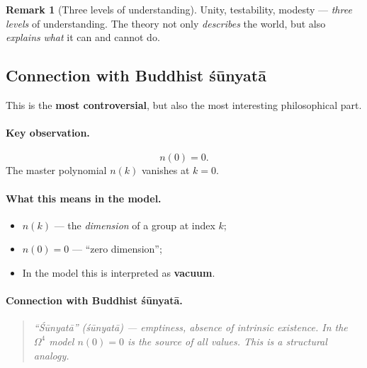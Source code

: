 \documentclass[11pt,a4paper]{article}
\newcommand{\Om}{\Omega^4}
\theoremstyle{definition}
\newtheorem{remark}[theorem]{Remark}
\begin{document}
\begin{remark}[Three levels of understanding]
\label{rem:three-understanding}
Unity, testability, modesty — \emph{three levels} of 
understanding. The theory not only \emph{describes} the world, but also 
\emph{explains} \emph{what} it can and cannot do.
\end{remark}

\subsection{Connection with Buddhist śūnyatā}
\label{subsec:shunyata}

This is the \textbf{most controversial}, but also the most interesting 
philosophical part.

\paragraph{Key observation.}
\begin{equation}
    \boxed{
    n(0) = 0.
    }
    \label{eq:n-zero}
\end{equation}
The master polynomial $n(k)$ vanishes at $k = 0$.

\paragraph{What this means in the model.}
\begin{itemize}
    \item $n(k)$ — the \emph{dimension} of a group at index $k$;
    \item $n(0) = 0$ — ``zero dimension'';
    \item In the model this is interpreted as \textbf{vacuum}.
\end{itemize}

\paragraph{Connection with Buddhist śūnyatā.}
\begin{quote}
\itshape
``Śūnyatā'' (śūnyatā) — emptiness, absence of intrinsic existence. 
In the $\Om$ model $n(0) = 0$ is the \emph{source} of all values. 
This is a \emph{structural} analogy.
\end{quote}
\end{document}
